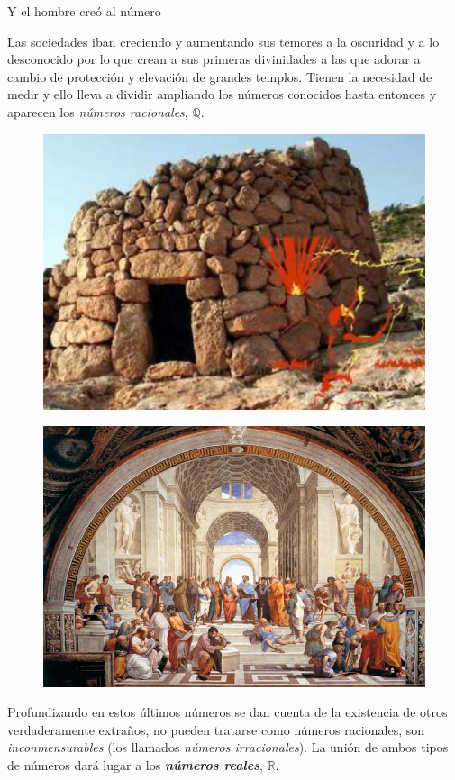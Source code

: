 \begin{adjustwidth}{25pt}{25pt}
\begin{myexampleblock}{Y el hombre creó al número}
\vspace{3mm} 
\begin{multicols}{2}
Las sociedades iban creciendo y aumentando sus temores a la oscuridad y a lo desconocido por lo que crean a sus primeras divinidades a las que adorar a cambio de protección y elevación de grandes templos. Tienen la necesidad de medir y ello lleva a dividir ampliando los números conocidos hasta entonces y aparecen los \emph{números racionales}, $\mathbb Q$.
\begin{figure}[H]
	\centering
	\includegraphics[width=.45\textwidth]{img-reales/reales03.png}	
\end{figure}
\end{multicols}

\vspace{3mm} 
\begin{multicols}{2}
\begin{figure}[H]
	\centering
	\includegraphics[width=.44\textwidth]{img-reales/reales04.png}	
\end{figure}
Profundizando en estos últimos números se dan cuenta de la existencia de otros verdaderamente extraños, no pueden tratarse como números racionales, son \emph{inconmensurables} (los llamados \emph{números irracionales}). La unión de ambos tipos de números dará lugar a los \textbf{\emph{números reales}}, $\boldsymbol{\mathbb R}$.
\end{multicols}

\end{myexampleblock}
\end{adjustwidth}

\newpage %

